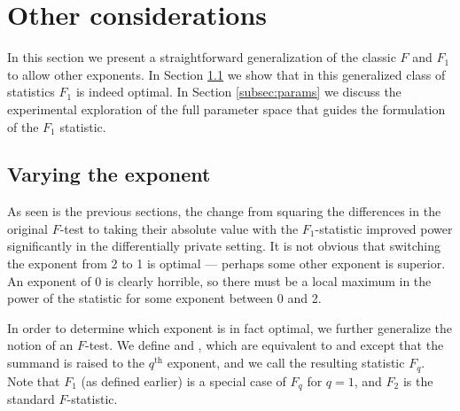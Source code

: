 \section{Other considerations}
\label{sec:considerations}

In this section we present a straightforward generalization of the classic $F$ and $F_1$ to allow other exponents. In Section \ref{subsec:fq} we show that in this generalized class of statistics $F_1$ is indeed optimal. In Section \ref{subsec:params} we discuss the experimental exploration of the full parameter space that guides the formulation of the $F_1$ statistic.

\subsection{Varying the exponent}\label{subsec:fq}
As seen is the previous sections, the change from squaring the differences in the original $F$-test to taking their absolute value with the $F_1$-statistic improved power significantly in the differentially private setting. It is not obvious that switching the exponent from 2 to 1 is optimal --- perhaps some other exponent is superior. An exponent of 0 is clearly horrible, so there must be a local maximum in the power of the statistic for some exponent between 0 and 2.

In order to determine which exponent is in fact optimal, we further generalize the notion of an $F$-test.  We define \sqa and \sqe, which are equivalent to \ssa and \sse except that the summand is raised to the $q^{\text{th}}$ exponent, and we call the resulting statistic $F_q$.  Note that $F_1$ (as defined earlier) is a special case of $F_q$ for $q=1$, and $F_2$ is the standard $F$-statistic.

